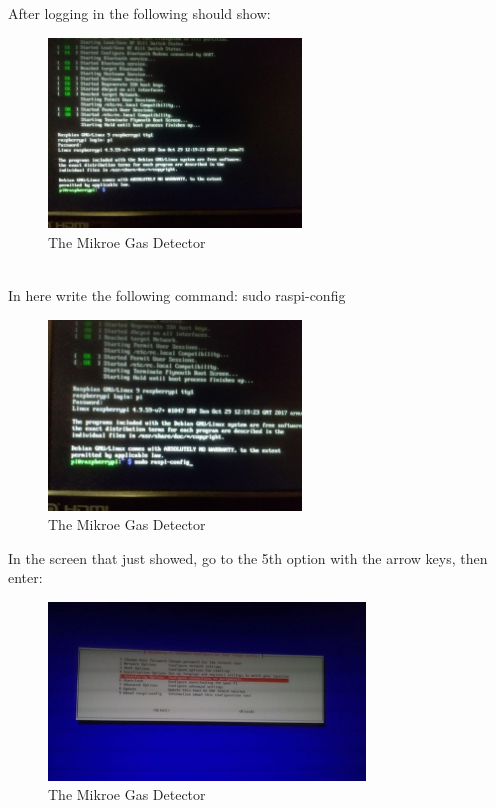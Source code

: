 \documentclass[11pt]{report}
\begin{document}
			\newpage
			After logging in the following should show:
			\begin{figure}[ht]
				\centering
				\includegraphics[width=0.6\textwidth]{images/pi/first_login_after_login.jpg} 
				\caption{The Mikroe Gas Detector}
			\end{figure}\\
			In here write the following command: sudo raspi-config
			\begin{figure}[ht]
				\centering
				\includegraphics[width=0.6\textwidth]{images/pi/ssh_command.jpg} 
				\caption{The Mikroe Gas Detector}
			\end{figure}
			\newpage
			In the screen that just showed, go to the 5th option with the arrow keys, then enter:
			\begin{figure}[ht]
				\centering
				\includegraphics[width=0.75\textwidth]{images/pi/ssh_1.jpg} 
				\caption{The Mikroe Gas Detector}
			\end{figure}\\
\end{document}
